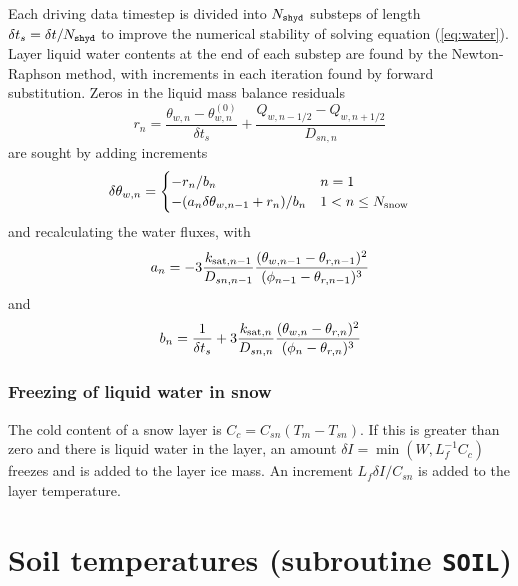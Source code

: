 \documentclass[fleqn]{article}
\begin{document}
Each driving data timestep is divided into $N_{\tt shyd}$ substeps of length $\delta t_s = \delta t / N_{\tt shyd}$ to improve the numerical stability of solving equation (\ref{eq:water}). Layer liquid water contents at the end of each substep are found by the Newton-Raphson method, with increments in each iteration found by forward substitution. Zeros in the liquid mass balance residuals
\begin{equation}
r_n = \frac{\theta_{w,n} - \theta_{w,n}^{(0)}}{\delta t_s} + \frac{Q_{w,n-1/2} - Q_{w,n+1/2}}{D_{sn,n}}
\end{equation}
are sought by adding increments
\begin{equation}
\delta\theta_{w,n} = 
\begin{cases}
   -r_n/b_n                           & n = 1 \\
  -(a_n\delta\theta_{w,n-1}+r_n)/b_n  & 1 < n \leq N_{\rm snow}
\end{cases}
\end{equation}
and recalculating the water fluxes, with
\begin{equation}
a_n = -3\frac{k_{{\rm sat},n-1}}{D_{sn,n-1}}\frac{(\theta_{w,n-1} - \theta_{r,n-1})^2}{(\phi_{n-1} - \theta_{r,n-1})^3}
\end{equation}
and
\begin{equation}
b_n = \frac{1}{\delta t_s} + 3\frac{k_{{\rm sat},n}}{D_{sn,n}}\frac{(\theta_{w,n} - \theta_{r,n})^2}{(\phi_n - \theta_{r,n})^3}
\end{equation}


\subsubsection{Freezing of liquid water in snow}
The cold content of a snow layer is $C_c = C_{sn}(T_m - T_{sn})$. If this is greater than zero and there is liquid water in the layer, an amount $\delta I = \min(W,L_f^{-1}C_c)$ freezes and is added to the layer ice mass. An increment $L_f\delta I/C_{sn}$ is added to the layer temperature.


\section{Soil temperatures (subroutine {\tt SOIL})}
\end{document}
